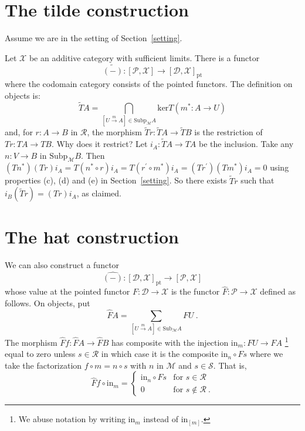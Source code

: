 \documentclass[a4paper,12pt,reqno]{amsart}
\theoremstyle{definition}
\theoremstyle{fact}
\theoremstyle{genquest}
\theoremstyle{step}
\newcommand{\lra}{\longrightarrow}
\newcommand{\ra}{\rightarrow}
\def\CD{{\mathscr D}}
\def\CM{{\mathscr M}}
\def\CP{{\mathscr P}}
\def\CR{{\mathscr R}}
\def\CS{{\mathscr S}}
\def\CX{{\mathscr X}}
\begin{document}
\section{The tilde construction}\label{tilde}

Assume we are in the setting of Section~\ref{setting}. 

Let $\CX$ be an additive category with sufficient limits. There is a functor
\begin{equation}\label{tilde}
\widetilde{(-)} : [\CP,\CX] \lra [\CD,\CX]_{\mathrm{pt}}
\end{equation}
where the codomain category consists of the pointed functors.
The definition on objects is:
\begin{equation}\label{tildeformula}
\widetilde{T}A = \bigcap_{[U\stackrel{m}\ra A] \in \mathrm{Subp}_{\CM}A} {\mathrm{ker}}T(m^*:A\ra U)
\end{equation}
and, for $r:A\ra B$ in $\CR$, the morphism 
$\widetilde{T}r : \widetilde{T}A \lra \widetilde{T}B$
is the restriction of $Tr : TA \ra TB$. 
Why does it restrict? Let $i_A : \widetilde{T}A \ra TA$
be the inclusion. Take any $n : V \ra B$ in $\mathrm{Subp}_{\CM}B$.   
Then $(Tn^*)(Tr)i_A = T(n^*\circ r)i_A = T(r^{\prime} \circ m^*)i_A = (Tr^{\prime})(Tm^*)i_A = 0$
using properties (c), (d) and (e) in Section~\ref{setting}. 
So there exists $\widetilde{T}r$ such that $i_B (\widetilde{T}r) = (Tr)i_A$,
as claimed.

\section{The hat construction}\label{hat}

We can also construct a functor
\begin{equation}\label{hat}
\widehat{(-)} : [\CD,\CX]_{\mathrm{pt}} \lra [\CP,\CX]
\end{equation}
whose value at the pointed functor $F : \CD\lra \CX$
is the functor $\widehat{F} : \CP \lra \CX$ defined as follows.   
On objects, put
$$\widehat{F}A = \sum_{[U\stackrel{m}\ra A] \in \mathrm{Sub}_{\CM}A}{FU} \ .$$  
The morphism $\widehat{F}f: \widehat{F}A \ra \widehat{F}B$
has composite with the injection $\mathrm{in}_m : FU \ra \widehat{F}A$
\footnote{We abuse notation by writing $\mathrm{in}_m$ instead of $\mathrm{in}_{[m]}$.} 
equal to zero unless $s\in \CR$ in which case it is the composite $\mathrm{in}_n \circ Fs$
where we take the factorization $f\circ m = n\circ s$ with $n$ in $\CM$ and $s\in \CS$.
That is,
\begin{equation*}
\widehat{F}f \circ \mathrm{in}_m =
\begin{cases}
\mathrm{in}_n \circ Fs & \text{for }  s \in \CR \\
0 & \text{for } s \notin \CR \ .
\end{cases}
\end{equation*}
\end{document}
